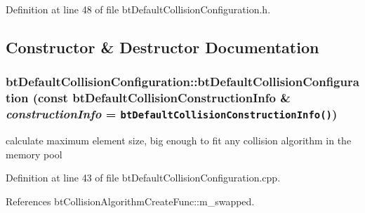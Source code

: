 Definition at line 48 of file btDefaultCollisionConfiguration.h.

\subsection{Constructor \& Destructor Documentation}
\hypertarget{classbt_default_collision_configuration_d08e7d72b0bd0d3f98290c2a1649b0d9}{
\subsubsection[btDefaultCollisionConfiguration]{\setlength{\rightskip}{0pt plus 5cm}btDefaultCollisionConfiguration::btDefaultCollisionConfiguration (const btDefaultCollisionConstructionInfo \& {\em constructionInfo} = {\tt btDefaultCollisionConstructionInfo()})}}
\label{classbt_default_collision_configuration_d08e7d72b0bd0d3f98290c2a1649b0d9}




calculate maximum element size, big enough to fit any collision algorithm in the memory pool 

Definition at line 43 of file btDefaultCollisionConfiguration.cpp.

References btCollisionAlgorithmCreateFunc::m\_\-swapped.

